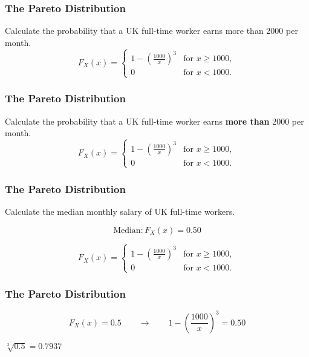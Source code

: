 \documentclass{beamer}
\begin{document}
\begin{frame}
	\frametitle{The Pareto Distribution}
	\LARGE
	\vspace{-1.8cm}
	Calculate the probability that a UK full-time worker earns more than 2000 per month.
	{
		\Large
		\[
		F_X(x) = \begin{cases}
		1-\left(\frac{1000}{x}\right)^3 & \text{for } x \ge 1000, \\
		0 & \text{for }x < 1000.
		\end{cases}
		\]
	}
\end{frame}
\begin{frame}
	\frametitle{The Pareto Distribution}
	\LARGE
	\vspace{-1.8cm}
Calculate the probability that a UK full-time worker earns \alert{\textbf{more than}} 2000 per month.
{
	\Large
\[
F_X(x) = \begin{cases}
1-\left(\frac{1000}{x}\right)^3 & \text{for } x \ge 1000, \\
0 & \text{for }x < 1000.
\end{cases}
\]
}
\end{frame}
\begin{frame}
	\frametitle{The Pareto Distribution}
	\LARGE
	\vspace{-1.2cm}
Calculate the median monthly salary of UK full-time workers.

\[ \mbox{Median}: F_X(x) = 0.50\]

{
	\LARGE
	\[
	F_X(x) = \begin{cases}
	1-\left(\frac{1000}{x}\right)^3 & \text{for } x \ge 1000, \\
	0 & \text{for }x < 1000.
	\end{cases}
	\]
}

\end{frame}
\begin{frame}
	\frametitle{The Pareto Distribution}
	\LARGE
	\vspace{-3.2cm}
	
	\[ F_X(x) = 0.5 \qquad \rightarrow \qquad 1-\left(\frac{1000}{x}\right)^3 = 0.50\]

\vspace{2.2cm}

$ \sqrt[3]{0.5} = 0.7937 $


\end{frame}
\end{document}
